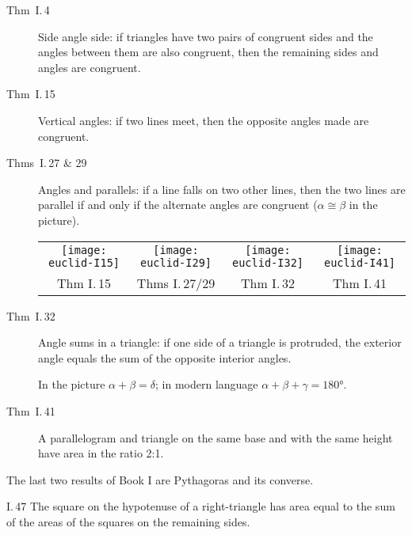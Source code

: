 \begin{description}
  \item[\normalfont Thm\ I.\,4] Side angle side: if triangles have two pairs of congruent sides and the angles between them are also congruent, then the remaining sides and angles are congruent.
  \item[\normalfont Thm\ I.\,15] Vertical angles: if two lines meet, then the opposite angles made are congruent.
  \item[\normalfont Thms\ I.\,27 \& 29] Angles and parallels: if a line falls on two other lines, then the two lines are parallel if and only if the alternate angles are congruent ($\alpha\cong \beta$ in the picture).
  \begin{center}
  \begin{tabular}{@{}c@{\qquad}c@{\quad}c@{\quad}c@{}}
  \texttt{[image: euclid-I15]}
  &
  \texttt{[image: euclid-I29]}
  &
  \texttt{[image: euclid-I32]}
  &
  \texttt{[image: euclid-I41]}
  \\
  Thm I.\,15
  &
  Thms I.\,27/29
  &
  Thm I.\,32
  &
  Thm I.\,41
  \end{tabular}
  \end{center}
  \item[\normalfont Thm\ I.\,32] Angle sums in a triangle: if one side of a triangle is protruded, the exterior angle equals the sum of the opposite interior angles.\par
  In the picture $\alpha+\beta=\delta$; in modern language $\alpha+\beta+\gamma=\ang{180}$.
  \item[\normalfont Thm\ I.\,41] A parallelogram and triangle on the same base and with the same height have area in the ratio 2:1.
\end{description}

The last two results of Book I are Pythagoras and its converse.

\begin{thm*}{I.\,47}{}
The square on the hypotenuse of a right-triangle has area equal to the sum of the areas of the squares on the remaining sides.
\end{thm*}

